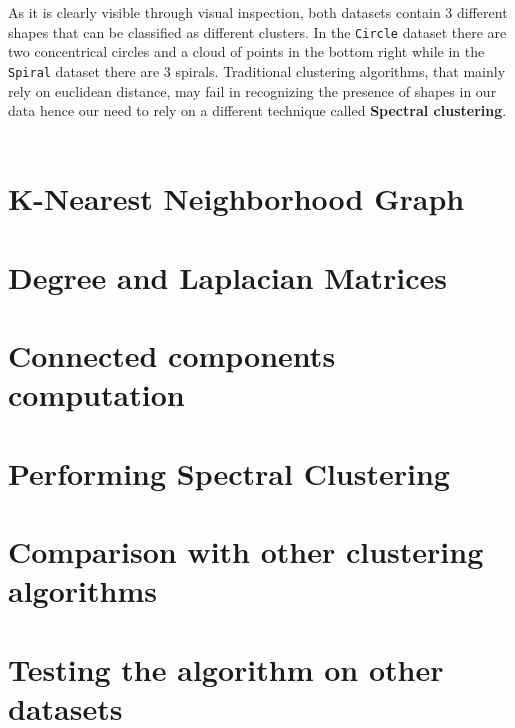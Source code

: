 \documentclass{article}
\numberwithin{equation}{section}
\theoremstyle{definition}
\theoremstyle{plain}
\theoremstyle{definition}
\theoremstyle{remark}
\begin{document}
As it is clearly visible through visual inspection, both datasets contain \(3\) different shapes that can be classified as different clusters. In the \texttt{Circle} dataset there are two concentrical circles and a cloud of points in the bottom right while in the \texttt{Spiral} dataset there are 3 spirals. Traditional clustering algorithms, that mainly rely on euclidean distance, may fail in recognizing the presence of shapes in our data hence our need to rely on a different technique called \textbf{Spectral clustering}. 
\\
\\

\section{K-Nearest Neighborhood Graph}

\section{Degree and Laplacian Matrices}
\label{sec2}

\section{Connected components computation}
\label{sec3}

\section{Performing Spectral Clustering}
\label{sec4}

\section{Comparison with other clustering algorithms}

\section{Testing the algorithm on other datasets}

\end{document}
